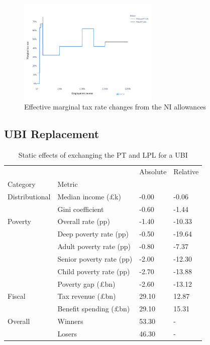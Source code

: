 \documentclass{article}
\begin{document}
    \begin{figure}
        \centering
        \includegraphics[width=0.6\textwidth]{images/fig_9.png}
        \caption{Effective marginal tax rate changes from the NI allowances}
        \label{fig:NI_mtr_effects}
    \end{figure}

    \subsection{UBI Replacement}

    \begin{table}
        \centering
        \begin{tabular}{llll}
            \toprule
                    &        & Absolute & Relative \\
            Category & Metric &          &          \\
            \midrule
            Distributional & Median income (£k) &    -0.00 &    -0.06 \\
                    & Gini coefficient &    -0.60 &    -1.44 \\
            Poverty & Overall rate (pp) &    -1.40 &   -10.33 \\
                    & Deep poverty rate (pp) &    -0.50 &   -19.64 \\
                    & Adult poverty rate (pp) &    -0.80 &    -7.37 \\
                    & Senior poverty rate (pp) &    -2.00 &   -12.30 \\
                    & Child poverty rate (pp) &    -2.70 &   -13.88 \\
                    & Poverty gap (£bn) &    -2.60 &   -13.12 \\
            Fiscal & Tax revenue (£bn) &    29.10 &    12.87 \\
                    & Benefit spending (£bn) &    29.10 &    15.31 \\
            Overall & Winners &    53.30 &        - \\
                    & Losers &    46.30 &        - \\
            \bottomrule
            \end{tabular}
        \caption{Static effects of exchanging the PT and LPL for a UBI}
        \label{tab:NI_UBI_effects}
    \end{table}
\end{document}
